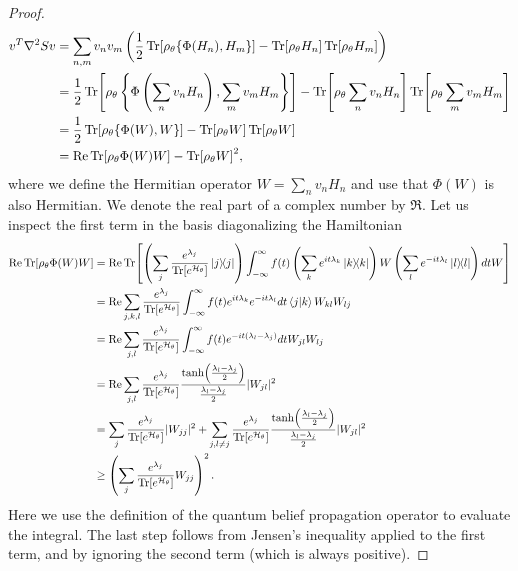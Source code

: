\documentclass[
    reprint,
    aps,
    prx,
    longbibliography
]{revtex4-2}
\begin{document}
\begin{proof}
\begin{align}
\begin{split}
\label{eq:positive_semidefinite_0}
    v^T \nabla^2 S v &=  \sum_{n,m} v_n v_m \left( \frac{1}{2} \Tr[ \rho_\theta \{ \Phi(H_n), H_m \}] - \Tr[ \rho_\theta H_n] \Tr[ \rho_\theta H_m] \right) \\
    &= \frac{1}{2} \Tr[ \rho_\theta \left\{ \Phi\left(\sum_n v_n H_n\right), \sum_m v_m H_m \right\}] - \Tr[ \rho_\theta \sum_n v_n H_n] \Tr[ \rho_\theta \sum_m v_m H_m] \\
    &= \frac{1}{2} \Tr[ \rho_\theta \{ \Phi(W), W \}] - \Tr[ \rho_\theta W] \Tr[ \rho_\theta W] \\
    &= \Re \Tr[\rho_\theta \Phi(W) W ] - \Tr[ \rho_\theta W]^2 ,
\end{split}
\end{align}
where we define the Hermitian operator $W = \sum_n v_n H_n$ and use that $\Phi(W)$ is also Hermitian. We denote the real part of a complex number by $\Re$. Let us inspect the first term in the basis diagonalizing the Hamiltonian
\begin{align}
\begin{split}
    \Re \Tr[\rho_\theta \Phi(W) W ] &= \Re \Tr[ \left(\sum_{j} \frac{e^{\lambda_j}}{\Tr[e^{\mathcal{H}_{\theta}}]} \dyad{j}\right) \int_{-\infty}^{\infty} f(t) \left( \sum_k e^{it\lambda_k} \dyad{k} \right) W \left(\sum_l e^{-it\lambda_l} \dyad{l}\right) dt W ]  \\
    &= \Re \sum_{j,k,l} \frac{e^{\lambda_j}}{\Tr[e^{\mathcal{H}_{\theta}}]} \int_{-\infty}^{\infty} f(t) e^{it\lambda_k} e^{-it\lambda_l} dt \braket{j}{k} W_{kl} W_{lj} \\
    &= \Re \sum_{j,l} \frac{e^{\lambda_j}}{\Tr[e^{\mathcal{H}_{\theta}}]} \int_{-\infty}^{\infty} f(t) e^{-it(\lambda_l - \lambda_j)} dt W_{jl} W_{lj} \\
    &= \Re \sum_{j,l} \frac{e^{\lambda_j}}{\Tr[e^{\mathcal{H}_{\theta}}]} \frac{\tanh(\frac{\lambda_l - \lambda_j}{2})}{\frac{\lambda_l - \lambda_j}{2}} |W_{jl}|^2 \\
    &= \sum_{j} \frac{e^{\lambda_j}}{\Tr[e^{\mathcal{H}_{\theta}}]} |W_{jj}|^2 + \sum_{j, l \neq j} \frac{e^{\lambda_j}}{\Tr[e^{\mathcal{H}_{\theta}}]} \frac{\tanh(\frac{\lambda_l - \lambda_j}{2})}{\frac{\lambda_l - \lambda_j}{2}} |W_{jl}|^2 \\
    &\geq \left( \sum_{j} \frac{e^{\lambda_j}}{\Tr[e^{\mathcal{H}_{\theta}}]} W_{jj} \right)^2 .
\end{split}
\end{align}
Here we use the definition of the quantum belief propagation operator to evaluate the integral. The last step follows from Jensen's inequality applied to the first term, and by ignoring the second term (which is always positive).

\end{proof}
\end{document}
